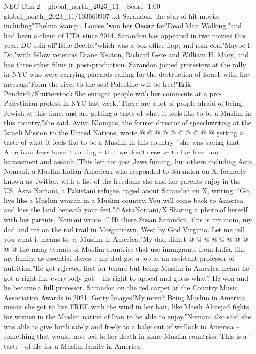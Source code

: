 \begin{textsample}{NEG Dim 2 – global\_north\_2023\_11 – Score -1.00 – global\_north\_2023\_11/103660907.txt}  \label{ex:f2_neg_134}
Sarandon, the star of hit movies including"Thelma \&amp ; Louise,"won her \textbf{Oscar} for"Dead Man Walking,"and had been a client of UTA since 2014.
Sarandon has appeared in two movies this year, DC spin-off"Blue Beetle,"which was a box-office flop, and rom-com"Maybe I Do,"with fellow veterans Diane Keaton, Richard Gere and William H.
Macy, and has three other films in post-production.
Sarandon joined protesters at the rally in NYC who were carrying placards calling for the destruction of Israel, with the message"From the river to the sea!
Palestine will be free!"Erik Pendzich/Shutterstock She enraged people with her comments at a pro-Palestinian protest in NYC last week."There are a lot of people afraid of being Jewish at this time, and are getting a taste of what it feels like to be a Muslim in this country,"she said.
Aviva Klompas, the former director of speechwriting at the Israeli Mission to the United Nations, wrote @ @ @ @ @ @ @ @ @ @ getting a taste of what it feels like to be a Muslim in this country ' she was saying that American Jews have it coming -- that we don't deserve to live free from harassment and assault."This left not just Jews fuming, but others including Asra Nomani, a Muslim Indian American who responded to Sarandon on X, formerly known as Twitter, with a list of the freedoms she and her parents enjoy in the US.
Asra Nomani, a Pakistani refugee, raged about Sarandon on X, writing :"Go, live like a Muslim woman in a Muslim country.
You will come back to America and kiss the land beneath your feet."@AsraNomani/X Sharing a photo of herself with her parents, Nomani wrote :"' Hi there Susan Sarandon, this is my mom, my dad and me on the rail trail in Morgantown, West by God Virginia.
Let me tell you what it means to be Muslim in America."My dad didn't @ @ @ @ @ @ @ @ @ @ the many tyrants of Muslim countries that use immigrants from India, like my family, as essential slaves... my dad got a job as an assistant professor of nutrition."He got rejected first for tenure but being Muslim in America meant he got a right like everybody got -- his right to appeal and guess what?
He won and he became a full professor.
Sarandon on the red carpet at the Country Music Association Awards in 2021.
Getty Images"My mom?
Being Muslim in America meant she got to live FREE with the wind in her hair, like Masih Alinejad fights for women in the Muslim nation of Iran to be able to enjoy."Nomani also said she was able to give birth safely and freely to a baby out of wedlock in America -- something that would have led to her death in some Muslim countries."This is a ' taste ' of life for a Muslim family in America.

\end{textsample}
